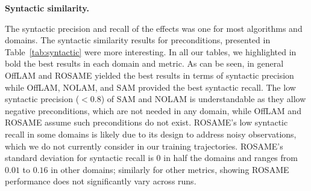 \documentclass[letterpaper]{article} %
\newcommand{\pre}{\ensuremath{\textit{pre}}\xspace}
\newcommand{\eff}{\ensuremath{\textit{eff}}\xspace}
\newcommand{\nolam}{NOLAM\xspace}
\newcommand{\offlam}{OffLAM\xspace}
\newcommand{\rosame}{ROSAME\xspace}
\newcommand{\samshort}{SAM\xspace}
\newcommand{\miniparagraph}[1]{\textbf{#1.}}
\newif\ifaddcomments
\newcommand{\roni}[1]{\ifaddcomments{\textcolor{red}{[Roni: #1]}}\fi}
\newcommand{\leo}[1]{\ifaddcomments{\textcolor{pink}{[Leonardo: #1]}}\fi}
\begin{document}



\miniparagraph{Syntactic similarity} 
%

%
The syntactic precision and recall of the effects was one for most algorithms and domains. The syntactic similarity results for preconditions, presented in Table~\ref{tab:syntactic} were more interesting. In all our tables, we highlighted in bold the best results in each domain and metric. 
As can be seen, in general \offlam and \rosame yielded the best results in terms of syntactic precision 
while \offlam, \nolam, and \samshort provided the best syntactic recall. 
The low syntactic precision ($<0.8$) of \samshort and \nolam is understandable as they allow negative preconditions, which are not needed in any domain, while \offlam and \rosame assume such preconditions do not exist. 
\rosame's low syntactic recall in some domains is likely due to its design to address noisy observations, which we do not currently consider in our training trajectories. 
%
\rosame's standard deviation for syntactic recall is $0$ in half the domains and ranges from $0.01$ to $0.16$ in other domains; similarly for other metrics, showing \rosame performance does not significantly vary across runs. 
\end{document}
